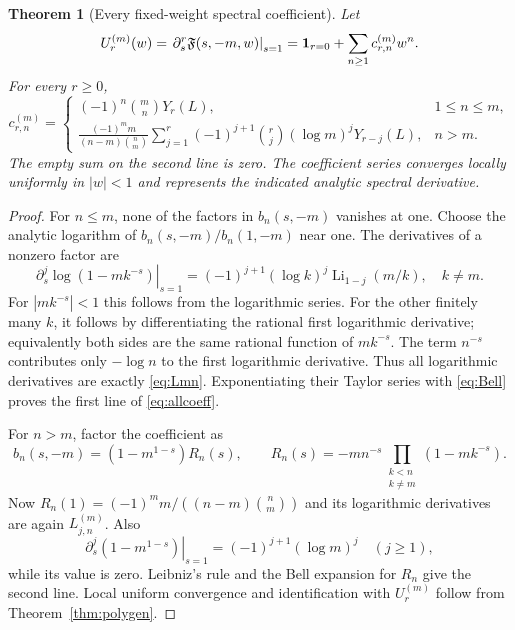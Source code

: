 \documentclass[11pt]{article}
\numberwithin{equation}{section}
\newtheorem{theorem}{Theorem}[section]
\theoremstyle{definition}\newtheorem{definition}[theorem]{Definition}
\theoremstyle{remark}\newtheorem{remark}[theorem]{Remark}
\DeclareMathOperator{\Li}{Li}
\begin{document}
\begin{theorem}[Every fixed-weight spectral coefficient]
\label{thm:higherres}
Let
\[
 U_r^{(m)}(w)=\left.\partial_s^r\mathfrak F(s,-m,w)\right|_{s=1}
            =\mathbf1_{r=0}+\sum_{n\ge1}c_{r,n}^{(m)}w^n.
\]
For every $r\ge0$,
\begin{equation}
 c_{r,n}^{(m)}=
 \begin{cases}
 (-1)^n\binom mn Y_r(L),&1\le n\le m,\\[4pt]
 \displaystyle\frac{(-1)^m m}{(n-m)\binom nm}
   \sum_{j=1}^r(-1)^{j+1}\binom rj(\log m)^jY_{r-j}(L),&n>m.
 \end{cases}
 \label{eq:allcoeff}
\end{equation}
The empty sum on the second line is zero. The coefficient series converges
locally uniformly in $|w|<1$ and represents the indicated analytic
spectral derivative.
\end{theorem}
\begin{proof}
For $n\le m$, none of the factors in $b_n(s,-m)$ vanishes at one. Choose
the analytic logarithm of $b_n(s,-m)/b_n(1,-m)$ near one. The derivatives
of a nonzero factor are
\begin{equation}
 \left.\partial_s^j\log(1-mk^{-s})\right|_{s=1}
       =(-1)^{j+1}(\log k)^j\Li_{1-j}(m/k),\quad k\ne m.
 \label{eq:factorjet}
\end{equation}
For $|mk^{-s}|<1$ this follows from the logarithmic series. For the other
finitely many $k$, it follows by differentiating the rational first
logarithmic derivative; equivalently both sides are the same rational
function of $mk^{-s}$. The term $n^{-s}$ contributes only $-\log n$ to
the first logarithmic derivative. Thus all logarithmic derivatives are
exactly \eqref{eq:Lmn}. Exponentiating their Taylor series with
\eqref{eq:Bell} proves the first line of \eqref{eq:allcoeff}.

For $n>m$, factor the coefficient as
\begin{equation}
 b_n(s,-m)=(1-m^{1-s})R_n(s),\qquad
 R_n(s)=-mn^{-s}\prod_{\substack{k<n\\k\ne m}}(1-mk^{-s}).
 \label{eq:isolatedzero}
\end{equation}
Now $R_n(1)=(-1)^m m/((n-m)\binom nm)$ and its logarithmic derivatives
are again $L_{j,n}^{(m)}$. Also
\[
 \left.\partial_s^j(1-m^{1-s})\right|_{s=1}
        =(-1)^{j+1}(\log m)^j\quad(j\ge1),
\]
while its value is zero. Leibniz's rule and the Bell expansion for $R_n$
give the second line. Local uniform convergence and identification with
$U_r^{(m)}$ follow from Theorem~\ref{thm:polygen}.
\end{proof}
\end{document}
